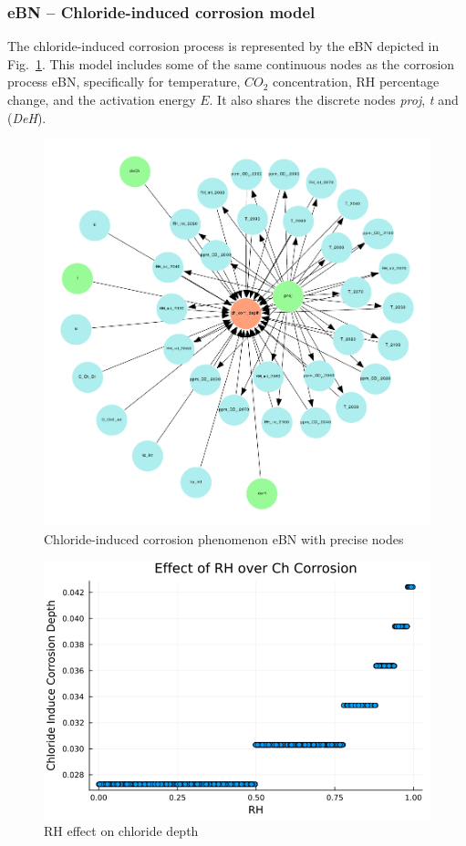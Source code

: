 \subsubsection{eBN -- Chloride-induced corrosion model}
The chloride-induced corrosion process is represented by the eBN depicted in Fig.~\ref{chloride_ebn}. This model includes some of the same continuous nodes as the corrosion process eBN, specifically for temperature, $CO_2$ concentration, RH percentage change, and the activation energy $E$. It also shares the  discrete nodes \textit{proj}, \textit{t} and (\textit{DeH}).
\begin{figure}[H]
    \centering
    \includegraphics[width=\linewidth]{imgs/pdfs/9_chloride_ebn.pdf}
    \caption{Chloride-induced corrosion phenomenon eBN with precise nodes}\label{chloride_ebn}
\end{figure}
\begin{figure}[H]
    \centering
    \includegraphics[width=\linewidth]{imgs/4_case_study/2_RH_vs_Chcorr.png}
    \caption{RH effect on chloride depth}\label{Chloride vs RH}
\end{figure}

